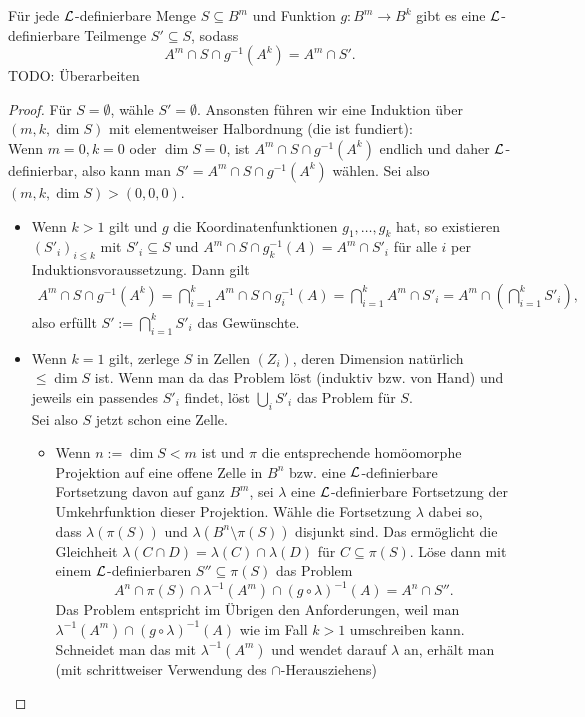 \begin{lemma}
	Für jede $\mathcal{L}$-definierbare Menge $S\subseteq B^m$ und Funktion $g:B^m\rightarrow B^k$ gibt es eine $\mathcal{L}$-definierbare Teilmenge $S'\subseteq S$, sodass $$A^m\cap S\cap g^{-1}(A^k)=A^m\cap S'.$$ TODO: Überarbeiten
\end{lemma}
\begin{proof}
	Für $S=\emptyset$, wähle $S'=\emptyset$. Ansonsten führen wir eine Induktion über $(m,k,\dim S)$ mit elementweiser Halbordnung (die ist fundiert):\\
	Wenn $m=0,k=0$ oder $\dim S=0$, ist $A^m\cap S\cap g^{-1}(A^k)$ endlich und daher $\mathcal{L}$-definierbar, also kann man $S'=A^m\cap S\cap g^{-1}(A^k)$ wählen. Sei also $(m,k,\dim S)>(0,0,0)$.
	\begin{itemize}
		\item Wenn $k>1$ gilt und $g$ die Koordinatenfunktionen $g_1,\dots,g_k$ hat, so existieren $(S'_i)_{i\leq k}$ mit $S'_i\subseteq S$ und $A^m\cap S\cap g_k^{-1}(A)=A^m\cap S'_i$ für alle $i$ per Induktionsvoraussetzung. Dann gilt
		\begin{align*}
		A^m\cap S\cap g^{-1}(A^k)=\bigcap\limits_{i=1}^k A^m\cap S\cap g_i^{-1}(A)=\bigcap\limits_{i=1}^k A^m\cap S'_i=A^m\cap(\bigcap\limits_{i=1}^k S'_i),
		\end{align*}
		also erfüllt $S':=\bigcap\limits_{i=1}^k S'_i$ das Gewünschte.
		\item Wenn $k=1$ gilt, zerlege $S$ in Zellen $(Z_i)$, deren Dimension natürlich $\leq\dim S$ ist. Wenn man da das Problem löst (induktiv bzw. von Hand) und jeweils ein passendes $S'_i$ findet, löst $\bigcup\limits_i S'_i$ das Problem für $S$.\\ Sei also $S$ jetzt schon eine Zelle.
		\begin{itemize}
			\item Wenn $n:=\dim S<m$ ist und $\pi$ die entsprechende homöomorphe Projektion auf eine offene Zelle in $B^n$  bzw. eine $\mathcal{L}$-definierbare Fortsetzung davon auf ganz $B^m$, sei $\lambda$ eine $\mathcal{L}$-definierbare Fortsetzung der Umkehrfunktion dieser Projektion. Wähle die Fortsetzung $\lambda$ dabei so, dass $\lambda(\pi(S))$ und $\lambda(B^n\setminus\pi(S))$ disjunkt sind. Das ermöglicht die Gleichheit $\lambda(C\cap D)=\lambda(C)\cap\lambda(D)$ für $C\subseteq\pi(S)$. Löse dann mit einem $\mathcal{L}$-definierbaren $S''\subseteq \pi(S)$ das Problem $$A^n\cap\pi(S)\cap\lambda^{-1}(A^m)\cap (g\circ\lambda)^{-1}(A)=A^n\cap S''.$$
			Das Problem entspricht im Übrigen den Anforderungen, weil man\linebreak $\lambda^{-1}(A^m)\cap (g\circ\lambda)^{-1}(A)$ wie im Fall $k>1$ umschreiben kann. Schneidet man das mit $\lambda^{-1}(A^m)$ und wendet darauf $\lambda$ an, erhält man (mit schrittweiser Verwendung des $\cap$-Herausziehens)

\end{itemize}
\end{itemize}
\end{proof}
